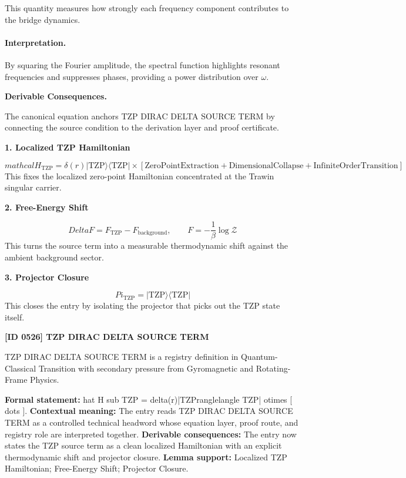 This quantity measures how strongly each frequency component contributes to the bridge dynamics.

\paragraph{Interpretation.}

By squaring the Fourier amplitude, the spectral function highlights resonant frequencies and suppresses phases, providing a power distribution over $\omega$.

\par\vspace{0.35em}
\noindent\textbf{Derivable Consequences.}\quad
\begingroup
\footnotesize
\raggedright
The canonical equation anchors TZP DIRAC DELTA SOURCE TERM by connecting the source condition to the derivation layer and proof certificate.
\par\endgroup

\noindent\textbf{1. Localized TZP Hamiltonian}\par
\[
mathcal{H}_{\mathrm{TZP}} = \delta(r)\lvert \mathrm{TZP}\rangle\langle \mathrm{TZP}\rvert \times \left[\text{ZeroPointExtraction} + \text{DimensionalCollapse} + \text{InfiniteOrderTransition}\right]
\]
\noindent This fixes the localized zero-point Hamiltonian concentrated at the Trawin singular carrier.\par
\noindent\textbf{2. Free-Energy Shift}\par
\[
Delta F = F_{\mathrm{TZP}} - F_{\mathrm{background}}, \qquad F=-\frac{1}{\beta}\log \mathcal{Z}
\]
\noindent This turns the source term into a measurable thermodynamic shift against the ambient background sector.\par
\noindent\textbf{3. Projector Closure}\par
\[
Pi_{\mathrm{TZP}} = \lvert \mathrm{TZP}\rangle\langle \mathrm{TZP}\rvert
\]
\noindent This closes the entry by isolating the projector that picks out the TZP state itself.\par

\clearpage
\noindent\textbf{[ID 0526] TZP DIRAC DELTA SOURCE TERM}\par
\vspace{0.35em}
\begingroup\small
{}
TZP DIRAC DELTA SOURCE TERM is a registry definition in Quantum-Classical Transition with secondary pressure from Gyromagnetic and Rotating-Frame Physics.

\begingroup\footnotesize\setlength{\emergencystretch}{3em}\sloppy
\textbf{Formal statement:} hat H sub TZP = delta(r)|TZPranglelangle TZP| otimes [ dots ]. \textbf{Contextual meaning:} The entry reads TZP DIRAC DELTA SOURCE TERM as a controlled technical headword whose equation layer, proof route, and registry role are interpreted together. \textbf{Derivable consequences:} The entry now states the TZP source term as a clean localized Hamiltonian with an explicit thermodynamic shift and projector closure. \textbf{Lemma support:} Localized TZP Hamiltonian; Free-Energy Shift; Projector Closure.\par
\endgroup

